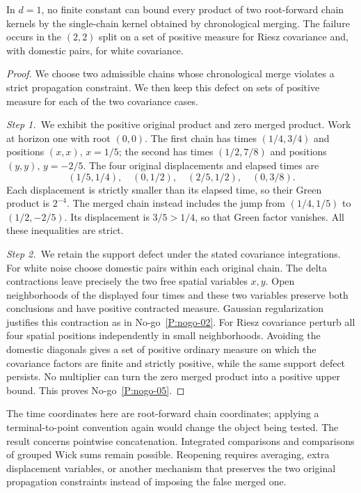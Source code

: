 \setcounter{nogo}{4}
\begin{nogo}
  \label{P:nogo-05}
  In $d=1$, no finite constant can bound every product of two root-forward
  chain kernels by the single-chain kernel obtained by chronological merging.
  The failure occurs in the $(2,2)$ split on a set of positive measure for
  Riesz covariance and, with domestic pairs, for white covariance.
\end{nogo}
\begin{proof}
  We choose two admissible chains whose chronological merge violates a strict
  propagation constraint. We then keep this defect on sets of positive measure
  for each of the two covariance cases.


  \medskip
  \noindent\textit{Step 1.~}We exhibit the positive original product and zero
  merged product.
  Work at horizon one with root $(0,0)$. The first chain has times
  $(1/4,3/4)$ and positions $(x,x)$, $x=1/5$; the second has times
  $(1/2,7/8)$ and positions $(y,y)$, $y=-2/5$.
  The four original displacements and elapsed times are
  \[
    (1/5,1/4),\quad(0,1/2),\quad(2/5,1/2),\quad(0,3/8).
  \]
  Each displacement is strictly smaller than its elapsed time, so their
  Green product is $2^{-4}$. The merged chain instead includes the jump
  from $(1/4,1/5)$ to $(1/2,-2/5)$. Its displacement is $3/5>1/4$,
  so that Green factor vanishes. All these inequalities are strict.


  \medskip
  \noindent\textit{Step 2.~}We retain the support defect under the stated
  covariance integrations.
  For white noise choose domestic pairs within each original chain. The
  delta contractions leave precisely the two free spatial variables $x,y$.
  Open neighborhoods of the displayed four times and these two variables
  preserve both conclusions and have positive contracted measure. Gaussian
  regularization justifies this contraction as in No-go~\ref{P:nogo-02}.
  For Riesz covariance perturb all four spatial positions independently
  in small neighborhoods. Avoiding the domestic diagonals gives a set of
  positive ordinary measure on which the covariance factors are finite and
  strictly positive, while the same support defect persists.
  No multiplier can turn the zero merged product into a positive upper bound.
  This proves No-go~\ref{P:nogo-05}.
\end{proof}



The time coordinates here are root-forward chain coordinates; applying a
terminal-to-point convention again would change the object being tested.
The result concerns pointwise concatenation. Integrated comparisons and
comparisons of grouped Wick sums remain possible. Reopening requires
averaging, extra displacement variables, or another mechanism that preserves
the two original propagation constraints instead of imposing the false
merged one.

